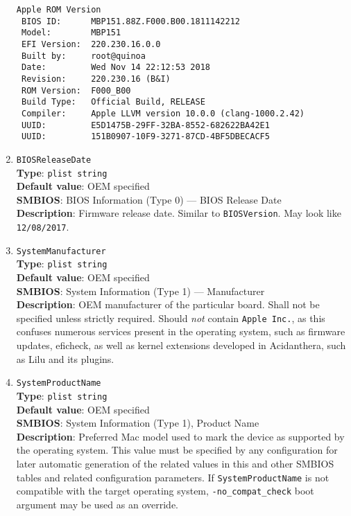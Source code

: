 \documentclass[]{article}
\begin{document}
\begin{enumerate}
\begin{verbatim}
Apple ROM Version
 BIOS ID:      MBP151.88Z.F000.B00.1811142212
 Model:        MBP151
 EFI Version:  220.230.16.0.0
 Built by:     root@quinoa
 Date:         Wed Nov 14 22:12:53 2018
 Revision:     220.230.16 (B&I)
 ROM Version:  F000_B00
 Build Type:   Official Build, RELEASE
 Compiler:     Apple LLVM version 10.0.0 (clang-1000.2.42)
 UUID:         E5D1475B-29FF-32BA-8552-682622BA42E1
 UUID:         151B0907-10F9-3271-87CD-4BF5DBECACF5
\end{verbatim}
\item
  \texttt{BIOSReleaseDate}\\
  \textbf{Type}: \texttt{plist\ string}\\
  \textbf{Default value}: OEM specified\\
  \textbf{SMBIOS}: BIOS Information (Type 0) --- BIOS Release Date\\
  \textbf{Description}: Firmware release date. Similar to
  \texttt{BIOSVersion}. May look like \texttt{12/08/2017}.
\item
  \texttt{SystemManufacturer}\\
  \textbf{Type}: \texttt{plist\ string}\\
  \textbf{Default value}: OEM specified\\
  \textbf{SMBIOS}: System Information (Type 1) --- Manufacturer\\
  \textbf{Description}: OEM manufacturer of the particular board. Shall
  not be specified unless strictly required. Should \emph{not} contain
  \texttt{Apple\ Inc.}, as this confuses numerous services present in
  the operating system, such as firmware updates, eficheck, as well as
  kernel extensions developed in Acidanthera, such as Lilu and its
  plugins.
\item
  \texttt{SystemProductName}\\
  \textbf{Type}: \texttt{plist\ string}\\
  \textbf{Default value}: OEM specified\\
  \textbf{SMBIOS}: System Information (Type 1), Product Name\\
  \textbf{Description}: Preferred Mac model used to mark the device as
  supported by the operating system. This value must be specified by any
  configuration for later automatic generation of the related values in
  this and other SMBIOS tables and related configuration parameters. If
  \texttt{SystemProductName} is not compatible with the target operating
  system, \texttt{-no\_compat\_check} boot argument may be used as an
  override.


\end{enumerate}
\end{document}
